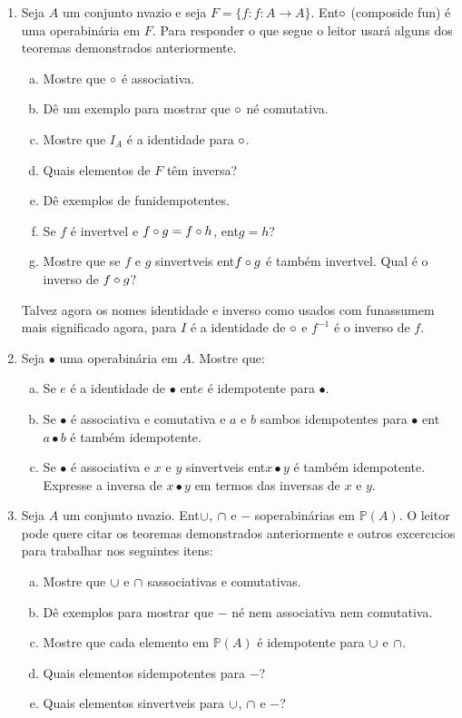 \begin{enumerate}[{\bf 1.}]
\item Seja $A$ um conjunto n\ao vazio e seja $F=\{f: f:A\to A\}$. Ent\ao $\circ$ (composi\cao de fun\caoi) \'e uma opera\cao bin\'aria em $F$. Para responder o que segue o leitor usar\'a alguns dos teoremas demonstrados anteriormente.
\begin{enumerate}[a)]
\item Mostre que $\circ$ \'e associativa. 
\item D\^e um exemplo para mostrar que $\circ$ n\ao \'e comutativa.
\item Mostre que $I_A$ \'e a identidade para $\circ$.
\item Quais elementos de $F$ t\^em inversa?
\item D\^e exemplos de fun\coes idempotentes.
\item Se $f$ \'e invert\ih vel e $f\circ g=f\circ h$, ent\ao $g=h$?
\item Mostre que se $f$ e $g$ s\ao invert\ih veis ent\ao $f\circ g$ \'e tamb\'em invert\ih vel. Qual \'e o inverso de $f\circ g$?
\end{enumerate}

Talvez agora os nomes identidade e inverso como usados com fun\coes assumem mais significado agora, para $I$ \'e a identidade de $\circ$ e $f^{-1}$ \'e o inverso de $f$.

\item Seja $\bullet$ uma opera\cao bin\'aria em $A$. Mostre que:
\begin{enumerate}[a)]
\item Se $e$ \'e a identidade de $\bullet$ ent\ao $e$ \'e idempotente para $\bullet$.
\item Se $\bullet$ \'e associativa e comutativa e $a$ e $b$ s\ao ambos idempotentes para $\bullet$ ent\ao $a\bullet b$ \'e tamb\'em idempotente.
\item Se $\bullet$ \'e associativa e $x$ e $y$ s\ao invert\ih veis ent\ao $x\bullet y$ \'e tamb\'em idempotente. Expresse a inversa de $x\bullet y$ em termos das inversas de $x$ e $y$.
\end{enumerate}

\item Seja $A$ um conjunto n\ao vazio. Ent\ao $\cup$, $\cap$ e $-$ s\ao opera\coes bin\'arias em $\mathbb{P}(A)$. O leitor pode quere citar os teoremas demonstrados anteriormente e outros excerc\i cios para trabalhar nos seguintes itens:
\begin{enumerate}[a)]
\item Mostre que $\cup$ e $\cap$ s\ao associativas e comutativas.
\item D\^e exemplos para mostrar que $-$ n\ao \'e nem associativa nem comutativa.
\item Mostre que cada elemento em $\mathbb{P}(A)$ \'e idempotente para $\cup$ e $\cap$.
\item Quais elementos s\ao idempotentes para $-$?
\item Quais elementos s\ao invert\ih veis para $\cup$, $\cap$ e $-$?
\end{enumerate}


\end{enumerate}
